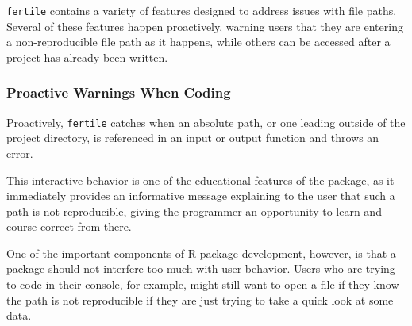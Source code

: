 \documentclass[12pt,twoside]{reedthesis}
\begin{document}
\texttt{fertile} contains a variety of features designed to address
issues with file paths. Several of these features happen proactively,
warning users that they are entering a non-reproducible file path as it
happens, while others can be accessed after a project has already been
written.

\subsubsection{Proactive Warnings When
Coding}\label{proactive-warnings-when-coding}

Proactively, \texttt{fertile} catches when an absolute path, or one
leading outside of the project directory, is referenced in an input or
output function and throws an error.

This interactive behavior is one of the educational features of the
package, as it immediately provides an informative message explaining to
the user that such a path is not reproducible, giving the programmer an
opportunity to learn and course-correct from there.

One of the important components of R package development, however, is
that a package should not interfere too much with user behavior. Users
who are trying to code in their console, for example, might still want
to open a file if they know the path is not reproducible if they are
just trying to take a quick look at some data.
\end{document}
